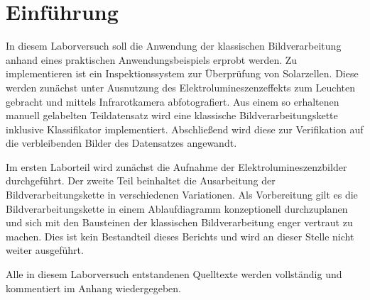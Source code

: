 \chapter{Einführung}

In diesem Laborversuch soll die Anwendung der klassischen Bildverarbeitung anhand eines praktischen Anwendungsbeispiels erprobt werden. Zu implementieren ist ein Inspektionssystem zur Überprüfung von Solarzellen. Diese werden zunächst unter Ausnutzung des Elektrolumineszenzeffekts zum Leuchten gebracht und mittels Infrarotkamera abfotografiert. Aus einem so erhaltenen manuell gelabelten Teildatensatz wird eine klassische Bildverarbeitungskette inklusive Klassifikator implementiert. Abschließend wird diese zur Verifikation auf die verbleibenden Bilder des Datensatzes angewandt.

Im ersten Laborteil wird zunächst die Aufnahme der Elektrolumineszenzbilder durchgeführt. Der zweite Teil beinhaltet die Ausarbeitung der Bildverarbeitungskette in verschiedenen Variationen. Als Vorbereitung gilt es die Bildverarbeitungskette in einem Ablaufdiagramm konzeptionell durchzuplanen und sich mit den Bausteinen der klassischen Bildverarbeitung enger vertraut zu machen. Dies ist kein Bestandteil dieses Berichts und wird an dieser Stelle nicht weiter ausgeführt.

Alle in diesem Laborversuch entstandenen Quelltexte werden vollständig und kommentiert im Anhang wiedergegeben.
